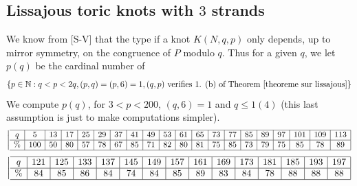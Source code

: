 \documentclass[12pt]{article}
\begin{document}
\subsection{Lissajous toric knots with $3$ strands}\label{Lissajousstat}
We know from  [S-V]	that the type if a knot $K(N,q,p)$ only depends, up to mirror symmetry, on the congruence of $P$ modulo $q$. Thus for a given $q$, we let $p(q)$ be the cardinal number of 
\begin{equation}
\{p\in\mathbb{N}:q<p<2q, (p,q)=(p,6)=1, (q,p)\ \mbox{verifies 1. (b) of Theorem}\ \ref{theoreme sur lissajous}\}
\end{equation}
We compute $p(q)$, for $3<p<200$, $(q,6)=1$ and $q\leq 1(4)$ (this last assumption is just to make computations simpler).
	 \[ \left| \begin{array}
	{ c | c | c | c| c | c | c |c | c | c | c | c| c | c | c |c | c | c | c | c| c | c | c |c|c|c }	
	\hline
	q& 	5 & 13 & 17& 25 & 29 & 37 & 41 & 49 & 53 & 61 & 65 & 73 & 77 & 85 & 89&97&101&109&113\\
	 	\hline
	 \%	&100	 &50  &80  &57 &78  &67  &85  &71  &82  &80  &81  &75  &85  &73 &79 &75&85&78&89  \\ 
	 	\hline
	 \end{array} \right.\]
	  \[ \left| \begin{array}
	 { c | c | c | c| c | c | c |c | c | c | c | c| c | c | c |c | c | c | c | c| c | c | c |c }	
	 \hline
	q  & 121&125 & 133 & 137 & 145 & 149 & 157 & 161 & 169& 173 & 181 &185 & 193 & 197\\
	 \hline
	\%	& 84& 85&86 & 84 & 74 & 84 & 85 & 89&83&84&78&88&88&88\\ 
	 \hline
	 \end{array} \right.\]
\end{document}
